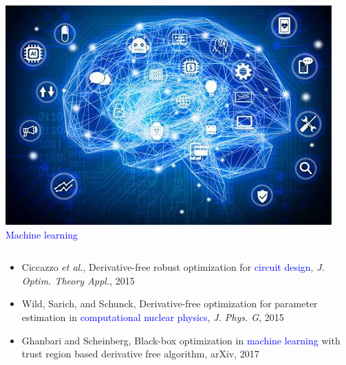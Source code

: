 \documentclass[slidestop,mathserif,xcolor=dvipsnames]{beamer}
\newcommand{\blue}[1]{\textcolor{blue}{#1}}
\newcommand\etal{\textit{et al.}}
\begin{document}
\begin{frame}
\begin{columns}[T]
\begin{column}{0.29\textwidth}
\begin{center}
     \includegraphics[width=\textwidth]{ml.jpeg}
     \\\blue{Machine learning}
     \end{center}
\end{column}
\end{columns}

\vspace{2ex}
       \begin{itemize}
           \item
               Ciccazzo \etal, Derivative-free robust optimization for \blue{circuit design},
               \textit{J. Optim. Theory Appl.}, 2015
            \item
                Wild, Sarich, and Schunck, Derivative-free optimization for parameter estimation in
                \blue{computational nuclear physics}, \textit{J. Phys. G}, 2015
           \item
               Ghanbari and Scheinberg, Black-box optimization in \blue{machine learning} with trust
               region based derivative free algorithm, arXiv, 2017
       \end{itemize}


\end{frame}
\end{document}
